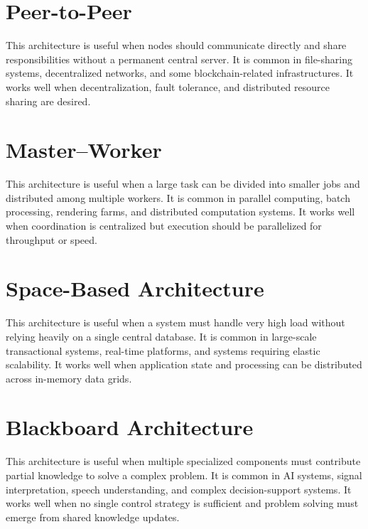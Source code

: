 \documentclass[a4paper]{article}
\begin{document}
    
    \section{Peer-to-Peer}
        This architecture is useful when nodes should communicate directly and share responsibilities without a permanent central server.
        It is common in file-sharing systems, decentralized networks, and some blockchain-related infrastructures.
        It works well when decentralization, fault tolerance, and distributed resource sharing are desired.
    
    
    \section{Master--Worker}
        This architecture is useful when a large task can be divided into smaller jobs and distributed among multiple workers.
        It is common in parallel computing, batch processing, rendering farms, and distributed computation systems.
        It works well when coordination is centralized but execution should be parallelized for throughput or speed.
    
    
    \section{Space-Based Architecture}
        This architecture is useful when a system must handle very high load without relying heavily on a single central database.
        It is common in large-scale transactional systems, real-time platforms, and systems requiring elastic scalability.
        It works well when application state and processing can be distributed across in-memory data grids.
    
    
    \section{Blackboard Architecture}
        This architecture is useful when multiple specialized components must contribute partial knowledge to solve a complex problem.
        It is common in AI systems, signal interpretation, speech understanding, and complex decision-support systems.
        It works well when no single control strategy is sufficient and problem solving must emerge from shared knowledge updates.
        
        
\end{document}
